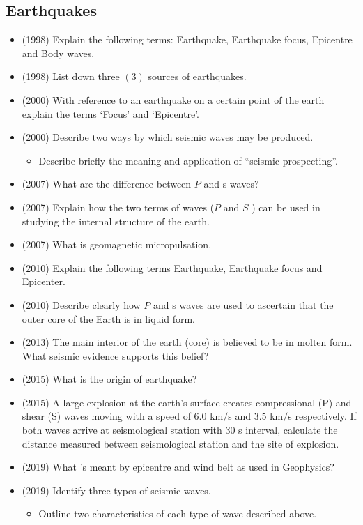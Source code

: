 \documentclass{article}
\begin{document}
\subsection{Earthquakes}
\begin{itemize}
\item (1998)  Explain the following terms: Earthquake, Earthquake focus, Epicentre and Body waves.
\item (1998)  List down three $ (3)$ sources of earthquakes.
\item (2000)  With reference to an earthquake on a certain point of the earth explain the terms ‘Focus’ and ‘Epicentre’.
\item (2000)  Describe two ways by which seismic waves may be produced.\begin{itemize}
\item Describe briefly the meaning and application of “seismic prospecting”. 
\end{itemize}
\item (2007)  What are the difference between $ P$ and s waves?
\item (2007)  Explain how the two terms of waves ($ P$ and $ S$ ) can be used in studying the internal structure of the earth. 
\item (2007)  What is geomagnetic micropulsation.
\item (2010)  Explain the following terms Earthquake, Earthquake focus and Epicenter.
\item (2010)  Describe clearly how $ P$ and s waves are used to ascertain that the outer core of the Earth is in liquid form. 
\item (2013)  The main interior of the earth (core) is believed to be in molten form. What seismic evidence supports this belief?
\item (2015)  What is the origin of earthquake?
\item (2015)  A large explosion at the earth's surface creates compressional (P) and shear (S) waves moving with a speed of $ 6.0$ km$/$s and $ 3.5$ km$/$s respectively. If both waves arrive at seismological station with $ 30$ s interval, calculate the distance measured between seismological station and the site of explosion. 
\item (2019)  What 's meant by epicentre and wind belt as used in Geophysics? 
\item (2019)  Identify three types of seismic waves.\begin{itemize}
\item Outline two characteristics of each type of wave described above.
\end{itemize}
\end{itemize}
\end{document}

